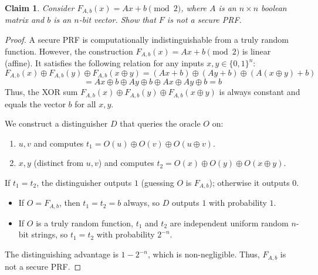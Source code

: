 \documentclass{article}
\newtheorem{claim}{Claim}
\begin{document}
\begin{claim}
Consider $F_{A,b}(x) = Ax + b \pmod 2$, where $A$ is an $n \times n$ boolean matrix and $b$ is an $n$-bit vector. Show that $F$ is not a secure PRF.
\end{claim}
\begin{proof}
A secure PRF is computationally indistinguishable from a truly random function. However, the construction $F_{A,b}(x) = Ax + b \pmod 2$ is linear (affine). It satisfies the following relation for any inputs $x, y \in \{0, 1\}^n$:
\[
F_{A,b}(x) \oplus F_{A,b}(y) \oplus F_{A,b}(x \oplus y) = (Ax + b) \oplus (Ay + b) \oplus (A(x \oplus y) + b)
\]
\[
= Ax \oplus b \oplus Ay \oplus b \oplus Ax \oplus Ay \oplus b = b
\]
Thus, the XOR sum $F_{A,b}(x) \oplus F_{A,b}(y) \oplus F_{A,b}(x \oplus y)$ is always constant and equals the vector $b$ for all $x, y$.

We construct a distinguisher $D$ that queries the oracle $O$ on:
\begin{enumerate}
    \item $u, v$ and computes $t_1 = O(u) \oplus O(v) \oplus O(u \oplus v)$.
    \item $x, y$ (distinct from $u, v$) and computes $t_2 = O(x) \oplus O(y) \oplus O(x \oplus y)$.
\end{enumerate}
If $t_1 = t_2$, the distinguisher outputs $1$ (guessing $O$ is $F_{A,b}$); otherwise it outputs $0$.
\begin{itemize}
    \item If $O = F_{A,b}$, then $t_1 = t_2 = b$ always, so $D$ outputs $1$ with probability $1$.
    \item If $O$ is a truly random function, $t_1$ and $t_2$ are independent uniform random $n$-bit strings, so $t_1 = t_2$ with probability $2^{-n}$.
\end{itemize}
The distinguishing advantage is $1 - 2^{-n}$, which is non-negligible. Thus, $F_{A,b}$ is not a secure PRF.
\end{proof}
\end{document}
